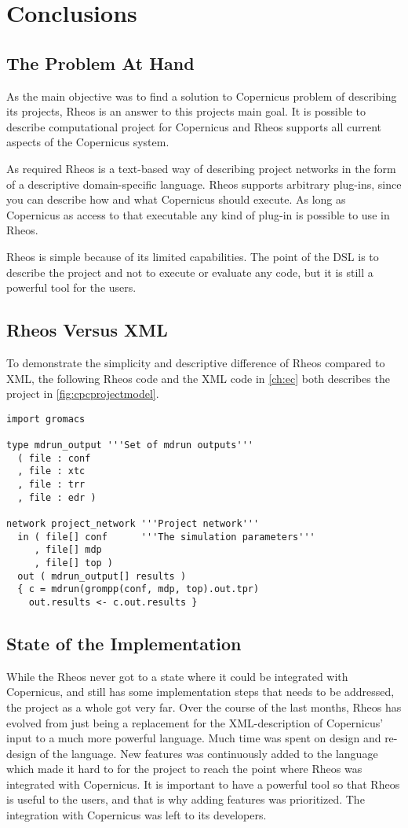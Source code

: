 \chapter{Conclusions}

\section{The Problem At Hand}
As the main objective was to find a solution to Copernicus problem of
describing its projects, Rheos is an answer to this projects main
goal. It is possible to describe computational project for Copernicus
and Rheos supports all current aspects of the Copernicus system.

As required Rheos is a text-based way of describing project networks
in the form of a descriptive domain-specific language. Rheos supports
arbitrary plug-ins, since you can describe how and what Copernicus
should execute. As long as Copernicus as access to that executable any
kind of plug-in is possible to use in Rheos.

Rheos is simple because of its limited capabilities. The point of the
DSL is to describe the project and not to execute or evaluate any
code, but it is still a powerful tool for the users.

\section{Rheos Versus XML}
To demonstrate the simplicity and descriptive difference of Rheos
compared to XML, the following Rheos code and the XML code in
\autoref{ch:ec} both describes the project in
\autoref{fig:cpcprojectmodel}.

\begin{verbatim}
import gromacs

type mdrun_output '''Set of mdrun outputs'''
  ( file : conf
  , file : xtc
  , file : trr
  , file : edr )

network project_network '''Project network'''
  in ( file[] conf      '''The simulation parameters'''
     , file[] mdp
     , file[] top )
  out ( mdrun_output[] results )
  { c = mdrun(grompp(conf, mdp, top).out.tpr)
    out.results <- c.out.results }
\end{verbatim}

\section{State of the Implementation}
While the Rheos never got to a state where it could be integrated with
Copernicus, and still has some implementation steps that needs to be
addressed, the project as a whole got very far. Over the course of the
last months, Rheos has evolved from just being a replacement for the
XML-description of Copernicus' input to a much more powerful
language. Much time was spent on design and re-design of the
language. New features was continuously added to the language which
made it hard to for the project to reach the point where Rheos was
integrated with Copernicus. It is important to have a powerful tool so
that Rheos is useful to the users, and that is why adding features was
prioritized. The integration with Copernicus was left to its
developers.

